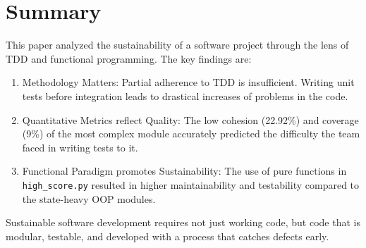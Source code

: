 \documentclass{article}
\begin{document}










\section{Summary}
This paper analyzed the sustainability of a software project through the lens of TDD and functional programming. The key findings are:
\begin{enumerate}
    \item Methodology Matters: Partial adherence to TDD is insufficient. Writing unit tests before integration leads to drastical increases of problems in the code.
    \item Quantitative Metrics reflect Quality: The low cohesion (22.92\%) and coverage (9\%) of the most complex module accurately predicted the difficulty the team faced in writing tests to it.
    \item Functional Paradigm promotes Sustainability: The use of pure functions in \texttt{high\_score.py} resulted in higher maintainability and testability compared to the state-heavy OOP modules.
\end{enumerate}
Sustainable software development requires not just working code, but code that is modular, testable, and developed with a process that catches defects early.
\end{document}
